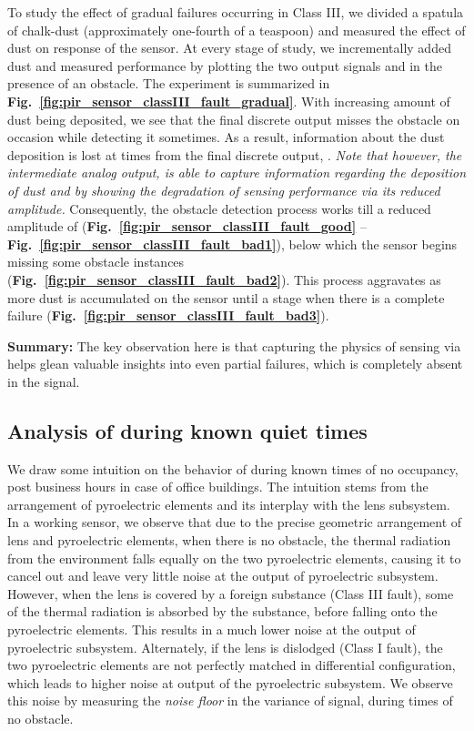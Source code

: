 To study the effect of gradual failures occurring in Class III, we divided a spatula of chalk-dust (approximately one-fourth of a teaspoon) and measured the effect of dust on response of the sensor. At every stage of study, we incrementally added dust and measured performance by plotting the two output signals \cout and \aout in the presence of an obstacle. The experiment is summarized in {\bfseries Fig.~\ref{fig:pir_sensor_classIII_fault_gradual}}. With increasing amount of dust being deposited, we see that the final discrete output misses the obstacle on occasion while detecting it sometimes. As a result, information about the dust deposition is lost at times from the final discrete output, \cout. \textit{Note that however, the intermediate analog output, \aout is able to capture information regarding the deposition of dust and by showing the degradation of sensing performance via its reduced amplitude.} Consequently, the obstacle detection process works till a reduced amplitude of \aout ({\bfseries Fig.~\ref{fig:pir_sensor_classIII_fault_good}} -- {\bfseries Fig.~\ref{fig:pir_sensor_classIII_fault_bad1}}), below which the sensor begins missing some obstacle instances ({\bfseries Fig.~\ref{fig:pir_sensor_classIII_fault_bad2}}). This process aggravates as more dust is accumulated on the sensor until a stage when there is a complete failure ({\bfseries Fig.~\ref{fig:pir_sensor_classIII_fault_bad3}}).

\noindent \textbf{Summary:} The key observation here is that capturing the physics of sensing via \aout helps glean valuable insights into even partial failures, which is completely absent in the \cout signal.


\subsection{Analysis of \aout during known quiet times} \label{subsec:aout_quiet_times} We draw some intuition on the behavior of \aout during known times of no occupancy, \eg post business hours in case of office buildings. The intuition stems from the arrangement of pyroelectric elements and its interplay with the lens subsystem. In a working sensor, we observe that due to the precise geometric arrangement of lens and pyroelectric elements, when there is no obstacle, the thermal radiation from the environment falls equally on the two pyroelectric elements, causing it to cancel out and leave very little noise at the output of pyroelectric subsystem. However, when the lens is covered by a foreign substance (\ie Class III fault), some of the thermal radiation is absorbed by the substance, before falling onto the pyroelectric elements. This results in a much lower noise at the output of pyroelectric subsystem. Alternately, if the lens is dislodged (\ie Class I fault), the two pyroelectric elements are not perfectly matched in differential configuration, which leads to higher noise at output of the pyroelectric subsystem. We observe this noise by measuring the \textit{noise floor} in the variance of \aout signal, during times of no obstacle.

